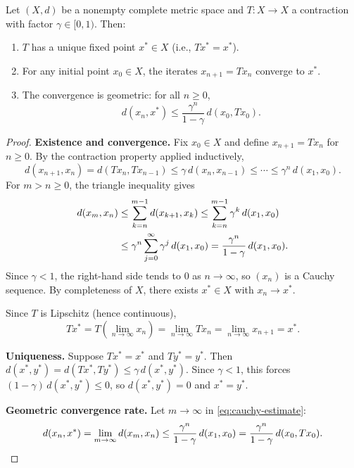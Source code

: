 \documentclass[11pt,a4paper]{article}
\begin{document}
\begin{theorem}
\label{thm:banach}
Let $(X, d)$ be a nonempty complete metric space and
$T \colon X \to X$ a contraction with factor $\gamma \in [0, 1)$.
Then:
\begin{enumerate}[label=(\roman*)]
    \item $T$ has a unique fixed point $x^* \in X$ (i.e.,
          $Tx^* = x^*$).
    \item For any initial point $x_0 \in X$, the iterates
          $x_{n+1} = Tx_n$ converge to $x^*$.
    \item The convergence is geometric: for all $n \geq 0$,
          \[
              d(x_n, x^*) \leq \frac{\gamma^n}{1 - \gamma}
              \, d(x_0, Tx_0).
          \]
\end{enumerate}
\end{theorem}

\begin{proof}
\textbf{Existence and convergence.}
Fix $x_0 \in X$ and define $x_{n+1} = Tx_n$ for $n \geq 0$.
By the contraction property applied inductively,
\[
    d(x_{n+1}, x_n) = d(Tx_n, Tx_{n-1})
    \leq \gamma\, d(x_n, x_{n-1})
    \leq \cdots \leq \gamma^n\, d(x_1, x_0).
\]
For $m > n \geq 0$, the triangle inequality gives
\begin{align}
    d(x_m, x_n)
    &\leq \sum_{k=n}^{m-1} d(x_{k+1}, x_k)
    \leq \sum_{k=n}^{m-1} \gamma^k\, d(x_1, x_0)
    \notag\\
    &\leq \gamma^n \sum_{j=0}^{\infty} \gamma^j\, d(x_1, x_0)
    = \frac{\gamma^n}{1 - \gamma}\, d(x_1, x_0).
    \label{eq:cauchy-estimate}
\end{align}
Since $\gamma < 1$, the right-hand side tends to $0$ as
$n \to \infty$, so $(x_n)$ is a Cauchy sequence.  By completeness of
$X$, there exists $x^* \in X$ with $x_n \to x^*$.

Since $T$ is Lipschitz (hence continuous),
\[
    Tx^* = T\!\left(\lim_{n \to \infty} x_n\right)
    = \lim_{n \to \infty} Tx_n
    = \lim_{n \to \infty} x_{n+1}
    = x^*.
\]

\textbf{Uniqueness.}
Suppose $Tx^* = x^*$ and $Ty^* = y^*$.  Then
$d(x^*, y^*) = d(Tx^*, Ty^*) \leq \gamma\, d(x^*, y^*)$.
Since $\gamma < 1$, this forces $(1 - \gamma)\, d(x^*, y^*) \leq 0$,
so $d(x^*, y^*) = 0$ and $x^* = y^*$.

\textbf{Geometric convergence rate.}
Let $m \to \infty$ in \eqref{eq:cauchy-estimate}:
\[
    d(x_n, x^*)
    = \lim_{m \to \infty} d(x_m, x_n)
    \leq \frac{\gamma^n}{1 - \gamma}\, d(x_1, x_0)
    = \frac{\gamma^n}{1 - \gamma}\, d(x_0, Tx_0).
    \qedhere
\]
\end{proof}
\end{document}
